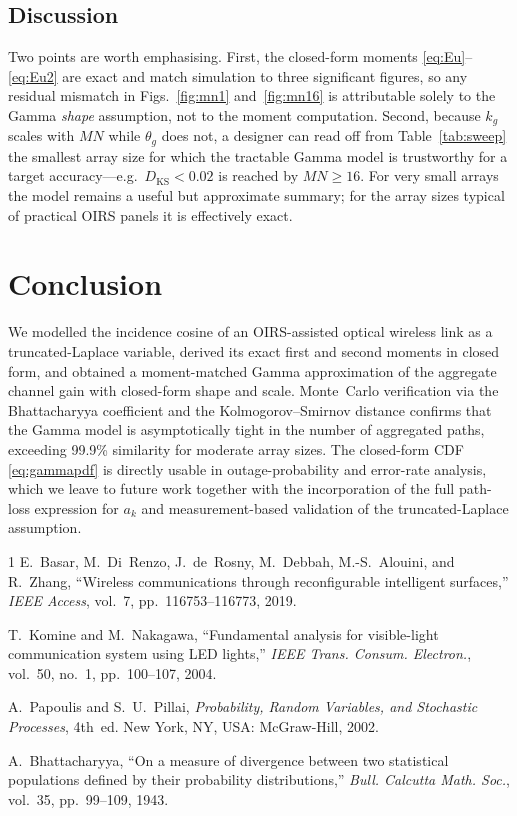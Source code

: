 \documentclass[conference]{IEEEtran}
\begin{document}
\subsection{Discussion}
Two points are worth emphasising. First, the closed-form moments
\eqref{eq:Eu}--\eqref{eq:Eu2} are exact and match simulation to three
significant figures, so any residual mismatch in Figs.~\ref{fig:mn1}
and~\ref{fig:mn16} is attributable solely to the Gamma \emph{shape}
assumption, not to the moment computation. Second, because $k_g$ scales with
$MN$ while $\theta_g$ does not, a designer can read off from
Table~\ref{tab:sweep} the smallest array size for which the tractable Gamma
model is trustworthy for a target accuracy---e.g.\ $D_{\mathrm{KS}}<0.02$ is
reached by $MN\ge 16$. For very small arrays the model remains a useful but
approximate summary; for the array sizes typical of practical OIRS panels it
is effectively exact.

\section{Conclusion}
We modelled the incidence cosine of an OIRS-assisted optical wireless link as
a truncated-Laplace variable, derived its exact first and second moments in
closed form, and obtained a moment-matched Gamma approximation of the
aggregate channel gain with closed-form shape and scale. Monte~Carlo
verification via the Bhattacharyya coefficient and the Kolmogorov--Smirnov
distance confirms that the Gamma model is asymptotically tight in the number
of aggregated paths, exceeding 99.9\% similarity for moderate
array sizes. The closed-form CDF \eqref{eq:gammapdf} is directly usable in
outage-probability and error-rate analysis, which we leave to future work
together with the incorporation of the full path-loss expression for $a_k$
and measurement-based validation of the truncated-Laplace assumption.

\begin{thebibliography}{1}
E.~Basar, M.~Di~Renzo, J.~de~Rosny, M.~Debbah, M.-S.~Alouini, and R.~Zhang,
``Wireless communications through reconfigurable intelligent surfaces,''
\emph{IEEE Access}, vol.~7, pp.~116753--116773, 2019.

T.~Komine and M.~Nakagawa,
``Fundamental analysis for visible-light communication system using LED
lights,'' \emph{IEEE Trans. Consum. Electron.}, vol.~50, no.~1,
pp.~100--107, 2004.

A.~Papoulis and S.~U.~Pillai, \emph{Probability, Random Variables, and
Stochastic Processes}, 4th~ed. New York, NY, USA: McGraw-Hill, 2002.

A.~Bhattacharyya, ``On a measure of divergence between two statistical
populations defined by their probability distributions,''
\emph{Bull. Calcutta Math. Soc.}, vol.~35, pp.~99--109, 1943.

\end{thebibliography}
\end{document}
